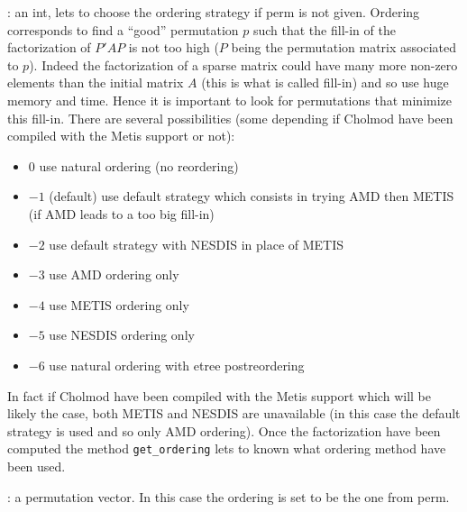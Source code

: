 \begin{varlist}
  : an int, lets to choose the ordering strategy if perm is not given. Ordering
  corresponds to find a ``good'' permutation $p$ such that the fill-in of the factorization of
  $P' A P$ is not too high ($P$ being the permutation matrix associated to $p$). Indeed
  the factorization of a sparse matrix could have many more non-zero elements than the initial matrix 
  $A$ (this is what is called fill-in) and so use huge memory and time. Hence it is important to look 
  for permutations that minimize this fill-in. There are several possibilities (some
  depending if Cholmod have been compiled with the Metis support or not):
     \begin{itemize} 
        \item $0$ use natural ordering (no reordering)
        \item $-1$ (default) use default strategy which consists in trying AMD then METIS (if AMD
              leads to a too big fill-in)
        \item $-2$ use default strategy with NESDIS in place of METIS
        \item $-3$ use AMD ordering only
        \item $-4$ use METIS ordering only
        \item $-5$ use NESDIS ordering only
        \item $-6$ use natural ordering with etree postreordering
     \end{itemize}
  In fact if Cholmod have been compiled with the Metis support which will be likely the case, both
  METIS and NESDIS are unavailable (in this case the default strategy is used and so only AMD
  ordering). Once the factorization have been computed the method \verb+get_ordering+ lets to
  known what ordering method have been used.
 
  : a permutation vector. In this case the ordering is set to be the one from perm.

\end{varlist}

